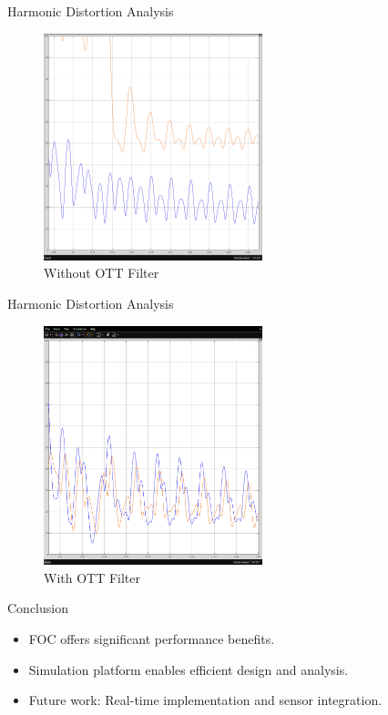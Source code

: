 \documentclass{beamer}
\begin{document}
\begin{frame}{Harmonic Distortion Analysis}
  \begin{figure}
    \includegraphics[width=2.5in]{conference/THDNOFilt.png} %
    \caption{Without OTT Filter}
  \end{figure}
\end{frame}
\begin{frame}{Harmonic Distortion Analysis}
  \begin{figure}
    \includegraphics[width=2.5in]{conference/THDFilt.png} %
    \caption{With OTT Filter}
  \end{figure}
\end{frame}

\begin{frame}{Conclusion}
  \begin{itemize}
    \item FOC offers significant performance benefits.
    \item Simulation platform enables efficient design and analysis.
    \item Future work: Real-time implementation and sensor integration.
  \end{itemize}
\end{frame}
\end{document}
